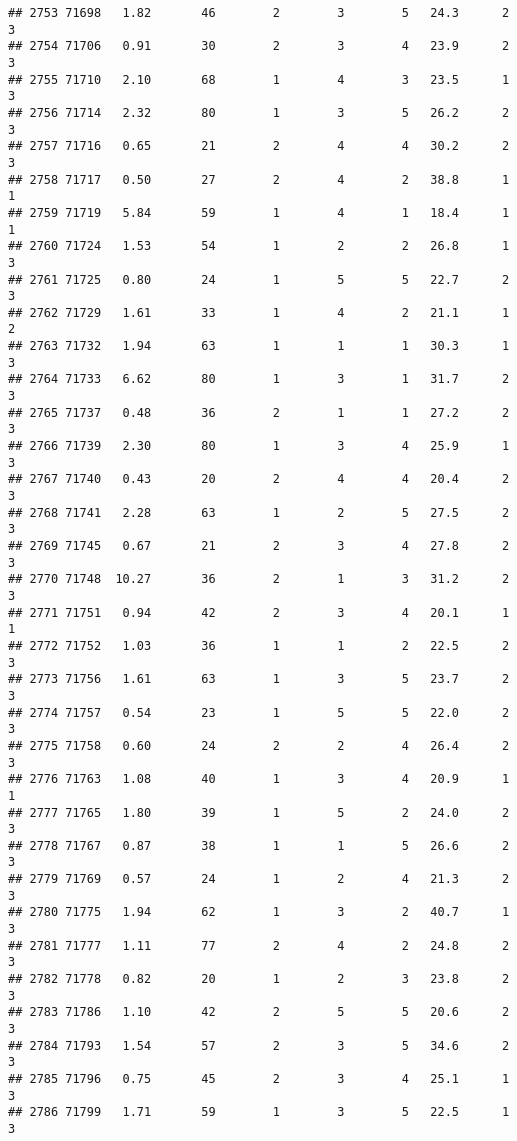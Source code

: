 \documentclass[
]{article}
\begin{document}
\begin{verbatim}
## 2753 71698   1.82       46        2        3        5   24.3      2      3
## 2754 71706   0.91       30        2        3        4   23.9      2      3
## 2755 71710   2.10       68        1        4        3   23.5      1      3
## 2756 71714   2.32       80        1        3        5   26.2      2      3
## 2757 71716   0.65       21        2        4        4   30.2      2      3
## 2758 71717   0.50       27        2        4        2   38.8      1      1
## 2759 71719   5.84       59        1        4        1   18.4      1      1
## 2760 71724   1.53       54        1        2        2   26.8      1      3
## 2761 71725   0.80       24        1        5        5   22.7      2      3
## 2762 71729   1.61       33        1        4        2   21.1      1      2
## 2763 71732   1.94       63        1        1        1   30.3      1      3
## 2764 71733   6.62       80        1        3        1   31.7      2      3
## 2765 71737   0.48       36        2        1        1   27.2      2      3
## 2766 71739   2.30       80        1        3        4   25.9      1      3
## 2767 71740   0.43       20        2        4        4   20.4      2      3
## 2768 71741   2.28       63        1        2        5   27.5      2      3
## 2769 71745   0.67       21        2        3        4   27.8      2      3
## 2770 71748  10.27       36        2        1        3   31.2      2      3
## 2771 71751   0.94       42        2        3        4   20.1      1      1
## 2772 71752   1.03       36        1        1        2   22.5      2      3
## 2773 71756   1.61       63        1        3        5   23.7      2      3
## 2774 71757   0.54       23        1        5        5   22.0      2      3
## 2775 71758   0.60       24        2        2        4   26.4      2      3
## 2776 71763   1.08       40        1        3        4   20.9      1      1
## 2777 71765   1.80       39        1        5        2   24.0      2      3
## 2778 71767   0.87       38        1        1        5   26.6      2      3
## 2779 71769   0.57       24        1        2        4   21.3      2      3
## 2780 71775   1.94       62        1        3        2   40.7      1      3
## 2781 71777   1.11       77        2        4        2   24.8      2      3
## 2782 71778   0.82       20        1        2        3   23.8      2      3
## 2783 71786   1.10       42        2        5        5   20.6      2      3
## 2784 71793   1.54       57        2        3        5   34.6      2      3
## 2785 71796   0.75       45        2        3        4   25.1      1      3
## 2786 71799   1.71       59        1        3        5   22.5      1      3

\end{verbatim}
\end{document}
